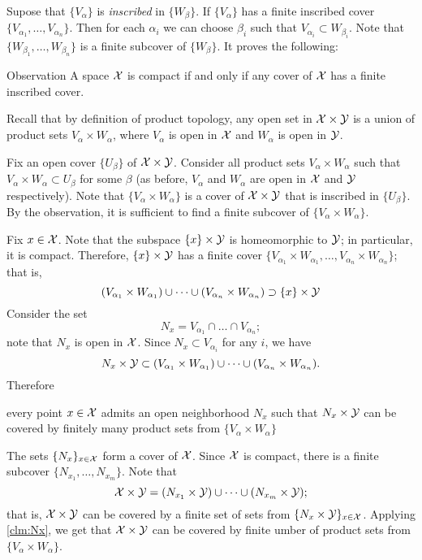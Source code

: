 Supose that $\{V_\alpha\}$ is \emph{inscribed} in $\{W_\beta\}$.
If $\{V_\alpha\}$ has a finite inscribed cover $\{V_{\alpha_1},\dots,V_{\alpha_n}\}$.
Then for each $\alpha_i$ we can choose $\beta_i$ such that $V_{\alpha_i}\subset  W_{\beta_i}$.
Note that $\{W_{\beta_1},\dots,W_{\beta_n}\}$ is a finite subcover of $\{W_\beta\}$.
It proves the following:

\begin{thm}{Observation}\label{obs:inscribed-cover}
A space $\mathcal{X}$ is compact if and only if any cover of $\mathcal{X}$ has a finite inscribed cover. 
\end{thm}

Recall that by definition of product topology, any open set in $\mathcal{X}\times\mathcal{Y}$ is a union of product sets 
$V_\alpha\times W_\alpha$, where $V_\alpha$ is open in $\mathcal{X}$ and $W_\alpha$ is open in $\mathcal{Y}$.

Fix an open cover $\{U_\beta\}$ of $\mathcal{X}\times\mathcal{Y}$.
Consider all product sets $V_\alpha\times W_\alpha$ such that $V_\alpha\times W_\alpha\subset U_\beta$ for some $\beta$ (as before, $V_\alpha$ and $W_\alpha$ are open in $\mathcal{X}$ and $\mathcal{Y}$ respectively).
Note that $\{V_\alpha\times W_\alpha\}$ is a cover of $\mathcal{X}\times\mathcal{Y}$ that is inscribed in $\{U_\beta\}$.
By the observation, it is sufficient to find a finite subcover of $\{V_\alpha\times W_\alpha\}$.

Fix $x \in \mathcal{X}$.
Note that the subspace $\{x\}\times \mathcal{Y}$ is homeomorphic to $\mathcal{Y}$;
in particular, it is compact.
Therefore, $\{x\}\times \mathcal{Y}$ has a finite cover $\{V_{\alpha_1}\times W_{\alpha_1},\dots,V_{\alpha_n}\times W_{\alpha_n}\}$; that is,
\[(V_{\alpha_1}\times W_{\alpha_1})\cup\dots\cup
(V_{\alpha_n}\times W_{\alpha_n})
\supset \{x\}\times \mathcal{Y}\]
Consider the set
\[N_x=V_{\alpha_1}\cap\dots\cap V_{\alpha_n};\]
note that $N_x$ is  open in $\mathcal{X}$.
Since $N_x\subset V_{\alpha_i}$ for any $i$, we have
\[N_x\times \mathcal{Y}\subset (V_{\alpha_1}\times W_{\alpha_1})\cup\dots\cup
(V_{\alpha_n}\times W_{\alpha_n}).\]
Therefore
\begin{clm}{}\label{clm:Nx}
every point $x\in\mathcal{X}$ admits an open neighborhood $N_x$ such that $N_x\times \mathcal{Y}$ can be covered by finitely many product sets from $\{V_\alpha\times W_\alpha\}$
\end{clm}


The sets $\{N_x\}_{x\in\mathcal{X}}$ form a cover of $\mathcal{X}$.
Since $\mathcal{X}$ is compact, 
there is a finite subcover $\{N_{x_1},\dots,N_{x_m}\}$.
Note that 
\[\mathcal{X}\times\mathcal{Y}=(N_{x_1}\times \mathcal{Y})\cup\dots\cup (N_{x_m}\times \mathcal{Y});\]
that is, $\mathcal{X}\times\mathcal{Y}$ can be covered by a finite set of sets from $\{N_x\times \mathcal{Y}\}_{x\in\mathcal{X}}$.
Applying \ref{clm:Nx}, we get that $\mathcal{X}\times\mathcal{Y}$ can be covered by finite umber of product sets from $\{V_\alpha\times W_\alpha\}$.
\qeds


